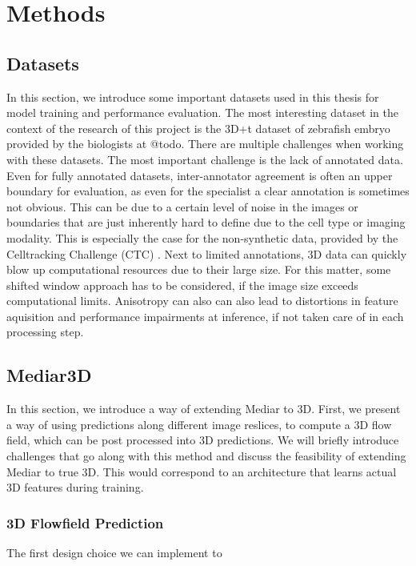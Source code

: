 \chapter{Methods}

\section{Datasets}
In this section, we introduce some important datasets used in this thesis for model training and performance evaluation. The most interesting dataset in the context of the research of this project is the 3D+t dataset of zebrafish embryo provided by the biologists at @todo.
There are multiple challenges when working with these datasets. The most important challenge is the lack of annotated data. Even for fully annotated datasets, inter-annotator agreement is often an upper boundary for evaluation, as even for the specialist a clear annotation is sometimes not obvious. This can be due to a certain level of noise in the images or boundaries that are just inherently hard to define due to the cell type or imaging modality. This is especially the case for the non-synthetic data, provided by the Celltracking Challenge (CTC) \cite{ctc}. Next to limited annotations, 3D data can quickly blow up computational resources due to their large size. For this matter, some shifted window approach has to be considered, if the image size exceeds computational limits. Anisotropy can also can also lead to distortions in feature aquisition and performance impairments at inference, if not taken care of in each processing step. 
\section{Mediar3D}

In this section, we introduce a way of extending Mediar to 3D. First, we present a way of using predictions along different image reslices, to compute a 3D flow field, which can be post processed into 3D predictions. We will briefly introduce challenges that go along with this method and discuss the feasibility of extending Mediar to true 3D. This would correspond to an architecture that learns actual 3D features during training.

\subsection{3D Flowfield Prediction}

The first design choice we can implement to 

